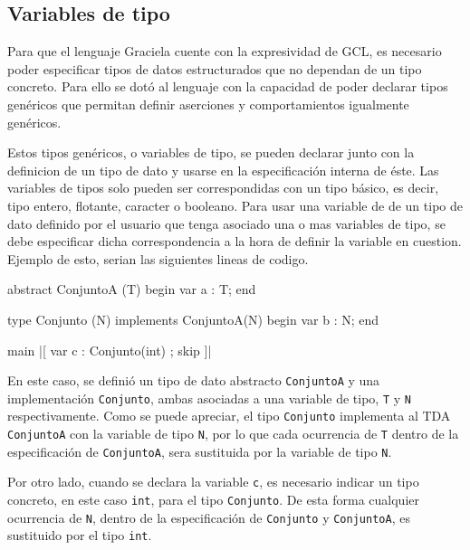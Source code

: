
\subsection{Variables de tipo}
Para que el lenguaje Graciela cuente con la expresividad de GCL, es necesario
poder especificar tipos de datos estructurados que no dependan de un tipo
concreto. Para ello se dotó al lenguaje con la capacidad de poder declarar
tipos genéricos que permitan definir aserciones y comportamientos igualmente
genéricos.

Estos tipos genéricos, o variables de tipo, se pueden declarar junto con la
definicion de un tipo de dato y usarse en la especificación interna de éste. Las
variables de tipos solo pueden ser correspondidas con un tipo básico, es decir,
tipo entero, flotante, caracter o booleano. Para usar una variable de de un tipo
de dato definido por el usuario que tenga asociado una o mas variables de tipo,
se debe especificar dicha correspondencia a la hora de definir la variable en
cuestion. Ejemplo de esto, serian las siguientes lineas de codigo.

\begin{gracielacode}
  abstract ConjuntoA (T) begin
    var a : T;
  end

  type Conjunto (N) implements ConjuntoA(N) begin
    var b : N;
  end

  main
   |[ var c : Conjunto(int)
    ; skip
   ]|

\end{gracielacode}

En este caso, se definió un tipo de dato abstracto \texttt{ConjuntoA} y una
implementación \texttt{Conjunto}, ambas asociadas a una variable de
tipo, \texttt{T} y \texttt{N} respectivamente. Como se puede apreciar, el tipo
\texttt{Conjunto} implementa al TDA \texttt{ConjuntoA} con la
variable de tipo \texttt{N}, por lo que cada ocurrencia de \texttt{T} dentro
de la especificación de \texttt{ConjuntoA}, sera sustituida por la variable de
tipo \texttt{N}.

Por otro lado, cuando se declara la variable \texttt{c}, es necesario indicar un
tipo concreto, en este caso \texttt{int}, para el tipo \texttt{Conjunto}. De
esta forma cualquier ocurrencia de \texttt{N}, dentro de la especificación de
\texttt{Conjunto} y \texttt{ConjuntoA}, es sustituido por el tipo \texttt{int}.



